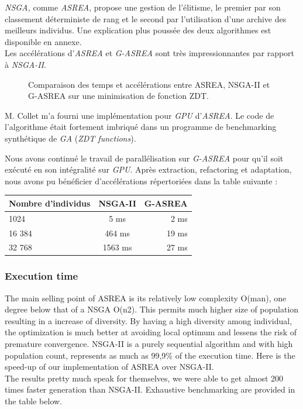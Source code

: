\documentclass[12pt]{memoir}
\begin{document}
\bigskip
\emph{NSGA,} comme \emph{ASREA}, propose une gestion de l'élitisme, le
premier par son classement déterministe de rang et le second par
l'utilisation d'une archive des meilleurs individus. Une explication
plus poussée des deux algorithmes est disponible en annexe. \\
Les accélérations d'\emph{ASREA} et \emph{G-ASREA} sont très
impressionnantes par rapport à \emph{NSGA-II}.
\begin{figure}[htbp]
	\begin{center}
		\caption{Comparaison des temps et accélérations entre ASREA, NSGA-II et G-ASREA sur une minimisation de fonction ZDT\cite{zitzler2000comparison}.}
	\end{center}
\end{figure}
M. Collet m'a fourni une implémentation pour \textit{GPU} d'\emph{ASREA}. Le
code de l'algorithme était fortement imbriqué dans un programme de
benchmarking synthétique de \emph{GA} (\emph{ZDT functions\cite{zitzler2000comparison}}).

Nous avons continué le travail de parallélisation sur \textit{G-ASREA} pour
qu'il soit exécuté en son intégralité sur \textit{GPU}. Après extraction,
refactoring et adaptation, nous avons pu bénéficier d'accélérations
répertoriées dans la table suivante :

\begin{center}
	\begin{tabular}{ |l| c| r| }
		\hline
		Nombre d'individus & NSGA-II & G-ASREA \\
		\hline
		1024 & 5 ms & 2 ms \\
		16 384 & 464 ms & 19 ms\\
		32 768  & 1563 ms& 27 ms\\
		\hline
	\end{tabular}
\end{center}

\subsubsection{Execution time}
The main selling point of ASREA is its relatively low complexity O(man), one degree below that of a NSGA O(n2).
This permits much higher size of population resulting in a increase of diversity. By having a high diversity
among individual, the optimization is much better at avoiding local optimum and lessens the risk of premature
convergence. NSGA-II is a purely sequential algorithm and with high population count, represents as much as
99,9\% of the execution time. Here is the speed-up of our implementation of ASREA over NSGA-II. \\
The results pretty much speak for themselves, we were able to get almost 200 times faster generation
than NSGA-II. Exhaustive benchmarking are provided in the table below.
 
\end{document}
